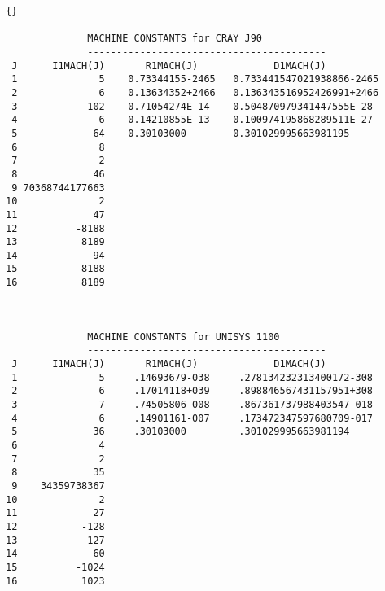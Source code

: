 \documentclass[twoside]{MATH77}
\begin{document}
\newpage
\begin{lstlisting}{}

              MACHINE CONSTANTS for CRAY J90
              -----------------------------------------
 J      I1MACH(J)       R1MACH(J)             D1MACH(J)
 1              5    0.73344155-2465   0.733441547021938866-2465
 2              6    0.13634352+2466   0.136343516952426991+2466
 3            102    0.71054274E-14    0.504870979341447555E-28
 4              6    0.14210855E-13    0.100974195868289511E-27
 5             64    0.30103000        0.301029995663981195
 6              8
 7              2
 8             46
 9 70368744177663
10              2
11             47
12          -8188
13           8189
14             94
15          -8188
16           8189



              MACHINE CONSTANTS for UNISYS 1100
              -----------------------------------------
 J      I1MACH(J)       R1MACH(J)             D1MACH(J)
 1              5     .14693679-038     .278134232313400172-308
 2              6     .17014118+039     .898846567431157951+308
 3              7     .74505806-008     .867361737988403547-018
 4              6     .14901161-007     .173472347597680709-017
 5             36     .30103000         .301029995663981194
 6              4
 7              2
 8             35
 9    34359738367
10              2
11             27
12           -128
13            127
14             60
15          -1024
16           1023
\end{lstlisting}
\end{document}

